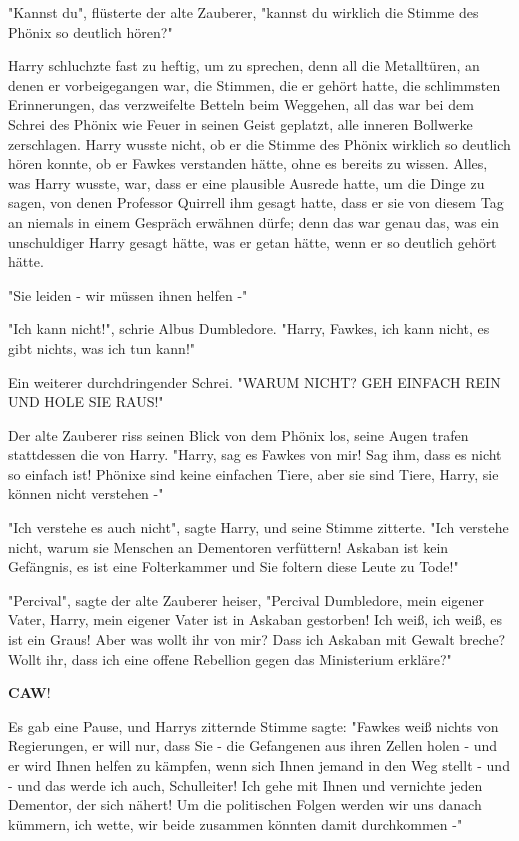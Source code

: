 {"Kannst du", flüsterte der alte Zauberer, "kannst du wirklich die Stimme des Phönix so deutlich hören?"

Harry schluchzte fast zu heftig, um zu sprechen, denn all die Metalltüren, an denen er vorbeigegangen war, die Stimmen, die er gehört hatte, die schlimmsten Erinnerungen, das verzweifelte Betteln beim Weggehen, all das war bei dem Schrei des Phönix wie Feuer in seinen Geist geplatzt, alle inneren Bollwerke zerschlagen. Harry wusste nicht, ob er die Stimme des Phönix wirklich so deutlich hören konnte, ob er Fawkes verstanden hätte, ohne es bereits zu wissen. Alles, was Harry wusste, war, dass er eine plausible Ausrede hatte, um die Dinge zu sagen, von denen Professor Quirrell ihm gesagt hatte, dass er sie von diesem Tag an niemals in einem Gespräch erwähnen dürfe; denn das war genau das, was ein unschuldiger Harry gesagt hätte, was er getan hätte, wenn er so deutlich gehört hätte.

"Sie leiden - wir müssen ihnen helfen -"

"Ich kann nicht!", schrie Albus Dumbledore. "Harry, Fawkes, ich kann nicht, es gibt nichts, was ich tun kann!"

Ein weiterer durchdringender Schrei. "WARUM NICHT? GEH EINFACH REIN UND HOLE SIE RAUS!"

Der alte Zauberer riss seinen Blick von dem Phönix los, seine Augen trafen stattdessen die von Harry. "Harry, sag es Fawkes von mir! Sag ihm, dass es nicht so einfach ist! Phönixe sind keine einfachen Tiere, aber sie sind Tiere, Harry, sie können nicht verstehen -"

"Ich verstehe es auch nicht", sagte Harry, und seine Stimme zitterte. "Ich verstehe nicht, warum sie Menschen an Dementoren verfüttern! Askaban ist kein Gefängnis, es ist eine Folterkammer und Sie foltern diese Leute zu Tode!"

"Percival", sagte der alte Zauberer heiser, "Percival Dumbledore, mein eigener Vater, Harry, mein eigener Vater ist in Askaban gestorben! Ich weiß, ich weiß, es ist ein Graus! Aber was wollt ihr von mir? Dass ich Askaban mit Gewalt breche? Wollt ihr, dass ich eine offene Rebellion gegen das Ministerium erkläre?"

\textbf{CAW}!

Es gab eine Pause, und Harrys zitternde Stimme sagte: "Fawkes weiß nichts von Regierungen, er will nur, dass Sie - die Gefangenen aus ihren Zellen holen - und er wird Ihnen helfen zu kämpfen, wenn sich Ihnen jemand in den Weg stellt - und - und das werde ich auch, Schulleiter! Ich gehe mit Ihnen und vernichte jeden Dementor, der sich nähert! Um die politischen Folgen werden wir uns danach kümmern, ich wette, wir beide zusammen könnten damit durchkommen -"

}
